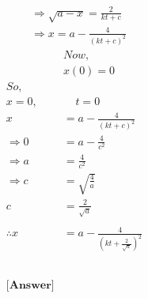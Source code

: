 \documentclass{article}
\begin{document}
\begin{homeworkProblem}
\[\begin{split}
      &\Rightarrow \sqrt{a-x} = \frac{2}{kt + c}
      \\
      &\Rightarrow x = a-\frac{4}{(kt+c)^2}
    \end{split}
    \]
    \pagebreak
    \[
    \begin{split}
        &Now,
        \\
        &x(0) = 0
        \\
        So,
        \\
        x=0, \ \ \ \ \ \ & \ \ \ \ \ t = 0
        \\
        x &= a-\frac{4}{(kt+c)^2}
        \\
        \Rightarrow 0 &= a - \frac{4}{c^2}
        \\
        \Rightarrow a &= \frac{4}{c^2}
        \\
        \Rightarrow c &= \sqrt{\frac{4}{a}}
        \\
        c &= \frac{2}{\sqrt{a}}
        \\\\
        \therefore x &= a - \frac{4}{\left(kt + \frac{2}{\sqrt{a}} \right)^2}
        \\ \\ \\ \\ \\ \\ \textbf{[Answer]}
    \end{split}
    \]
\end{homeworkProblem}
\\\\
\end{document}
